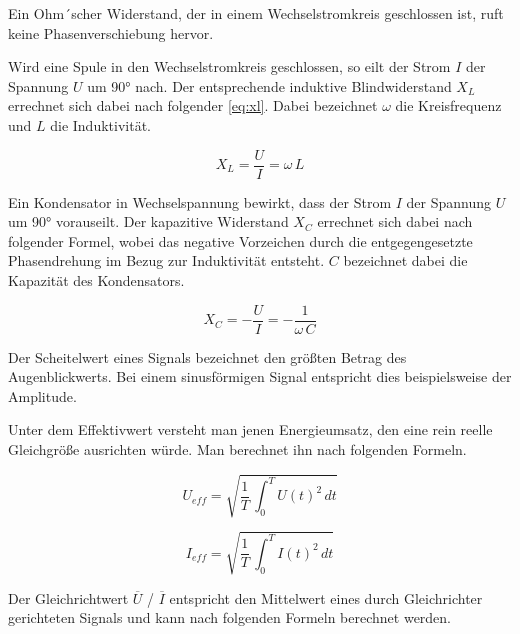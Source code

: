\documentclass[11pt,ngerman]{scrartcl}
\begin{document}
\vspace{2mm}

Ein Ohm´scher Widerstand, der in einem Wechselstromkreis geschlossen ist, ruft keine Phasenverschiebung hervor.

\vspace{2mm}

Wird eine Spule in den Wechselstromkreis geschlossen, so eilt der Strom $I$ der Spannung $U$ um 90° nach. Der entsprechende induktive Blindwiderstand $X_L$ errechnet sich dabei nach folgender \autoref{eq:xl}. Dabei bezeichnet $\omega$ die Kreisfrequenz und $L$ die Induktivität.

\begin{equation}
	X_L = \frac{U}{I} = \omega \,L
	\label{eq:xl}
\end{equation}

Ein Kondensator in Wechselspannung bewirkt, dass der Strom $I$ der Spannung $U$ um 90° vorauseilt. Der kapazitive Widerstand $X_C$ errechnet sich dabei nach folgender Formel, wobei das negative Vorzeichen durch die entgegengesetzte Phasendrehung im Bezug zur Induktivität entsteht. $C$ bezeichnet dabei die Kapazität des Kondensators.

\begin{equation}
	X_C = -\frac{U}{I} = -\frac{1}{\omega \,C}
	\label{eq:xc}
\end{equation}

Der Scheitelwert eines Signals bezeichnet den größten Betrag des Augenblickwerts. Bei einem sinusförmigen Signal entspricht dies beispielsweise der Amplitude.

\vspace{2mm}

Unter dem Effektivwert versteht man jenen Energieumsatz, den eine rein reelle Gleichgröße ausrichten würde. Man berechnet ihn nach folgenden Formeln.

\begin{equation}
	U_{eff} = \sqrt{\frac{1}{T}\,  \int_{0}^{T} U(t)^2 \,dt }
	\label{eq:ueff}
\end{equation}

\begin{equation}
	I_{eff} = \sqrt{\frac{1}{T}\,  \int_{0}^{T} I(t)^2 \,dt }
	\label{eq:ieff}
\end{equation}

Der Gleichrichtwert $\overline{U}$ / $\overline{I}$ entspricht den Mittelwert eines durch Gleichrichter gerichteten Signals und kann nach folgenden Formeln berechnet werden.
\end{document}
